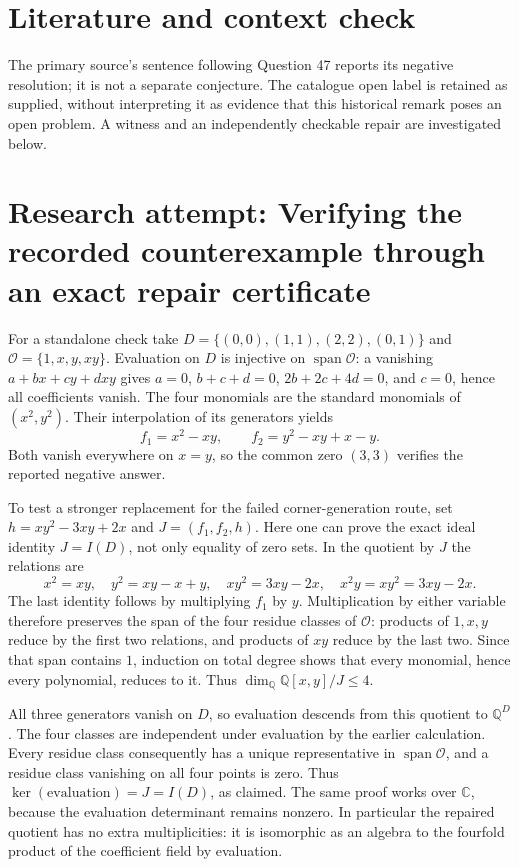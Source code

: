 \documentclass[11pt]{article}
\begin{document}
\section{Literature and context check}
The primary source's sentence following Question 47 reports its negative resolution; it is not a separate conjecture. The catalogue open label is retained as supplied, without interpreting it as evidence that this historical remark poses an open problem. A witness and an independently checkable repair are investigated below.
\section{Research attempt: Verifying the recorded counterexample through an exact repair certificate}
For a standalone check take $D=\{(0,0),(1,1),(2,2),(0,1)\}$ and $\mathcal O=\{1,x,y,xy\}$. Evaluation on $D$ is injective on $\operatorname{span}\mathcal O$: a vanishing $a+bx+cy+dxy$ gives $a=0$, $b+c+d=0$, $2b+2c+4d=0$, and $c=0$, hence all coefficients vanish. The four monomials are the standard monomials of $(x^2,y^2)$. Their interpolation of its generators yields
\[
f_1=x^2-xy,\qquad f_2=y^2-xy+x-y.
\]
Both vanish everywhere on $x=y$, so the common zero $(3,3)$ verifies the reported negative answer.

To test a stronger replacement for the failed corner-generation route, set $h=xy^2-3xy+2x$ and $J=(f_1,f_2,h)$. Here one can prove the exact ideal identity $J=I(D)$, not only equality of zero sets. In the quotient by $J$ the relations are
\[
x^2=xy,\quad y^2=xy-x+y,\quad xy^2=3xy-2x,\quad
x^2y=xy^2=3xy-2x.
\]
The last identity follows by multiplying $f_1$ by $y$. Multiplication by either variable therefore preserves the span of the four residue classes of $\mathcal O$: products of $1,x,y$ reduce by the first two relations, and products of $xy$ reduce by the last two. Since that span contains $1$, induction on total degree shows that every monomial, hence every polynomial, reduces to it. Thus $\dim_{\mathbb Q}\mathbb Q[x,y]/J\le4$.

All three generators vanish on $D$, so evaluation descends from this quotient to $\mathbb Q^D$. The four classes are independent under evaluation by the earlier calculation. Every residue class consequently has a unique representative in $\operatorname{span}\mathcal O$, and a residue class vanishing on all four points is zero. Thus $\ker(\mathrm{evaluation})=J=I(D)$, as claimed. The same proof works over $\mathbb C$, because the evaluation determinant remains nonzero. In particular the repaired quotient has no extra multiplicities: it is isomorphic as an algebra to the fourfold product of the coefficient field by evaluation.
\end{document}
